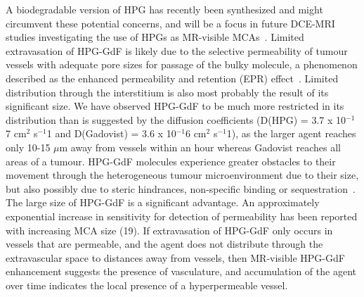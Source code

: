A biodegradable version of HPG has recently been synthesized and might circumvent these potential concerns, and will be a focus in future \acs{DCE-MRI} studies investigating the use of HPGs as MR-visible \acs{MCA}s~\cite{Shenoi:2013id}.
Limited extravasation of \acs{HPG-GdF} is likely due to the selective permeability of tumour vessels with adequate pore sizes for passage of the bulky molecule, a phenomenon described as the enhanced permeability and retention (\acs{EPR}) effect~\cite{Maeda:2013hq}.
Limited distribution through the interstitium is also most probably the result of its significant size.
We have observed \acs{HPG-GdF} to be much more restricted in its distribution than is suggested by the diffusion coefficients (D(HPG) = 3.7 x 10$^{-1}$7 cm$^2$ s$^{-1}$1 and D(Gadovist) = 3.6 x 10$^{-1}$6 cm$^2$ s$^{-1}$1), as the larger agent reaches only 10-15 $\mu$m away from vessels within an hour whereas Gadovist reaches all areas of a tumour.
\acs{HPG-GdF} molecules experience greater obstacles to their movement through the heterogeneous tumour microenvironment due to their size, but also possibly due to steric hindrances, non-specific binding or sequestration~\cite{Minchinton:2006gs}.
The large size of \acs{HPG-GdF} is a significant advantage.
An approximately exponential increase in sensitivity for detection of permeability has been reported with increasing MCA size (19).
If extravasation of \acs{HPG-GdF} only occurs in vessels that are permeable, and the agent does not distribute through the extravascular space to distances away from vessels, then MR-visible \acs{HPG-GdF} enhancement suggests the presence of vasculature, and accumulation of the agent over time indicates the local presence of a hyperpermeable vessel.

